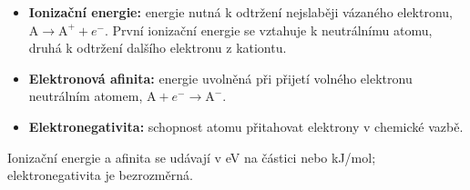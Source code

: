 \begin{itemize}
\item \textbf{Ionizační energie:} energie nutná k odtržení nejslaběji vázaného elektronu, $\mathrm A\to\mathrm{A^+}+e^-$. První ionizační energie se vztahuje k neutrálnímu atomu, druhá k odtržení dalšího elektronu z kationtu.
\item \textbf{Elektronová afinita:} energie uvolněná při přijetí volného elektronu neutrálním atomem, $\mathrm A+e^-\to\mathrm{A^-}$.
\item \textbf{Elektronegativita:} schopnost atomu přitahovat elektrony v chemické vazbě.
\end{itemize}
Ionizační energie a afinita se udávají v eV na částici nebo kJ/mol; elektronegativita je bezrozměrná.

